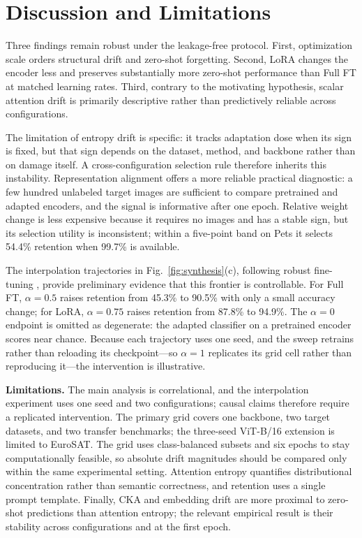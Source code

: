 \documentclass[conference]{IEEEtran}
\begin{document}
\section{Discussion and Limitations}
Three findings remain robust under the leakage-free protocol. First, optimization scale orders structural drift and zero-shot forgetting. Second, LoRA changes the encoder less and preserves substantially more zero-shot performance than Full FT at matched learning rates. Third, contrary to the motivating hypothesis, scalar attention drift is primarily descriptive rather than predictively reliable across configurations.

The limitation of entropy drift is specific: it tracks adaptation dose when its sign is fixed, but that sign depends on the dataset, method, and backbone rather than on damage itself. A cross-configuration selection rule therefore inherits this instability. Representation alignment offers a more reliable practical diagnostic: a few hundred unlabeled target images are sufficient to compare pretrained and adapted encoders, and the signal is informative after one epoch. Relative weight change is less expensive because it requires no images and has a stable sign, but its selection utility is inconsistent; within a five-point band on Pets it selects 54.4\% retention when 99.7\% is available.

The interpolation trajectories in Fig.~\ref{fig:synthesis}(c), following robust fine-tuning \cite{wortsman2022robust}, provide preliminary evidence that this frontier is controllable. For Full FT, $\alpha=0.5$ raises retention from 45.3\% to 90.5\% with only a small accuracy change; for LoRA, $\alpha=0.75$ raises retention from 87.8\% to 94.9\%. The $\alpha=0$ endpoint is omitted as degenerate: the adapted classifier on a pretrained encoder scores near chance. Because each trajectory uses one seed, and the sweep retrains rather than reloading its checkpoint---so $\alpha=1$ replicates its grid cell rather than reproducing it---the intervention is illustrative.

\textbf{Limitations.} The main analysis is correlational, and the interpolation experiment uses one seed and two configurations; causal claims therefore require a replicated intervention. The primary grid covers one backbone, two target datasets, and two transfer benchmarks; the three-seed ViT-B/16 extension is limited to EuroSAT. The grid uses class-balanced subsets and six epochs to stay computationally feasible, so absolute drift magnitudes should be compared only within the same experimental setting. Attention entropy quantifies distributional concentration rather than semantic correctness, and retention uses a single prompt template. Finally, CKA and embedding drift are more proximal to zero-shot predictions than attention entropy; the relevant empirical result is their stability across configurations and at the first epoch.
\end{document}
